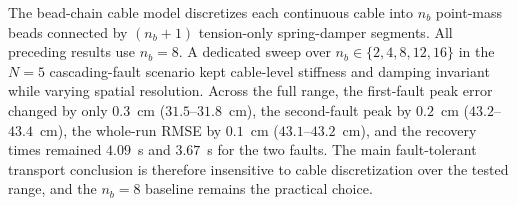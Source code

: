 The bead-chain cable model discretizes each continuous cable into $n_b$ point-mass beads connected by $(n_b{+}1)$ tension-only spring-damper segments. All preceding results use $n_b{=}8$. A dedicated sweep over $n_b \in \{2, 4, 8, 12, 16\}$ in the $N{=}5$ cascading-fault scenario kept cable-level stiffness and damping invariant while varying spatial resolution. Across the full range, the first-fault peak error changed by only $0.3$~cm ($31.5$--$31.8$~cm), the second-fault peak by $0.2$~cm ($43.2$--$43.4$~cm), the whole-run RMSE by $0.1$~cm ($43.1$--$43.2$~cm), and the recovery times remained $4.09$~s and $3.67$~s for the two faults. The main fault-tolerant transport conclusion is therefore insensitive to cable discretization over the tested range, and the $n_b{=}8$ baseline remains the practical choice.

